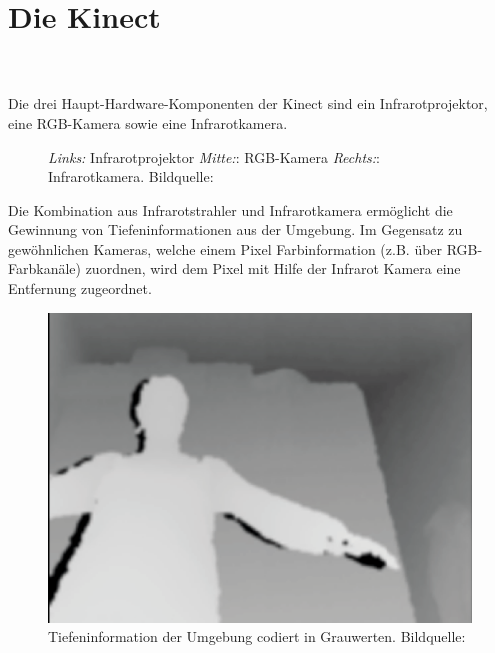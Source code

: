 \chapter{Die Kinect}
\label{ch:kinect}
\\\\
Die drei Haupt-Hardware-Komponenten der Kinect sind ein Infrarotprojektor, eine RGB-Kamera sowie eine Infrarotkamera.\\
\begin{figure}[!ht]
  \centering
   \caption{\emph {Links:} Infrarotprojektor \emph {Mitte:}: RGB-Kamera  \emph {Rechts:}: Infrarotkamera. Bildquelle:\cite{borenstein2012making}  }
\end{figure}
Die Kombination aus Infrarotstrahler und Infrarotkamera ermöglicht die Gewinnung von Tiefeninformationen aus der Umgebung. Im Gegensatz zu gewöhnlichen Kameras, welche einem Pixel Farbinformation (z.B.  über RGB-Farbkanäle) zuordnen, wird dem Pixel mit Hilfe der Infrarot Kamera eine Entfernung zugeordnet.

\begin{figure}
\centering
\includegraphics[width=0.5\linewidth]{./Res/greyscale.png}
\caption{Tiefeninformation der Umgebung codiert in Grauwerten. Bildquelle:\cite{borenstein2012making}}
\label{fig:Kinect_9Points}
\end{figure}


